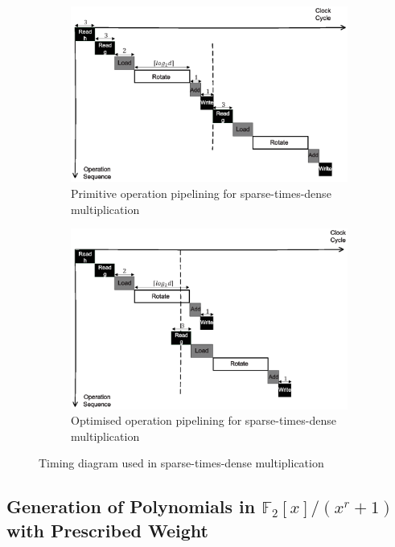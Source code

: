 \documentclass[runningheads]{llncs}
\begin{document}
\begin{figure}[!tb]
\centering
\begin{subfigure}[t]{0.45\textwidth}\centering
\includegraphics[width=\textwidth]{./fig/pipeline_mul.eps}
\caption{Primitive operation pipelining for sparse-times-dense multiplication}
\label{fig:pipeline_mul}
\end{subfigure}
\hspace{1em}
\begin{subfigure}[t]{0.45\textwidth}\centering
\includegraphics[width=\textwidth]{./fig/pipeline_mul2.eps}
\caption{Optimised operation pipelining for sparse-times-dense multiplication }
\label{fig:pipeline_mul2}
\end{subfigure}
\caption{Timing diagram used in sparse-times-dense multiplication}
\end{figure}

\subsection{Generation of Polynomials in $\mathbb{F}_2[x]/(x^r+1)$ with Prescribed Weight}
\end{document}
